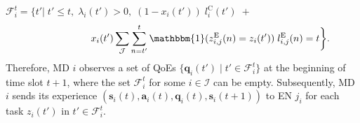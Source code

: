 \documentclass[12pt,draftclsnofoot,onecolumn]{IEEEtran}
\begin{document}
$\mathcal{F}_i^t =\bigg \{ t' \bigg|\; t' \leq t,\; \lambda_i(t')>0, \; (1 - x_i(t')) \; l_i^{\text{C}}(t') \; + $ \vspace{-3mm}
\begin{equation}
	\hspace{20mm} x_i(t')\sum\limits_{\mathcal{J}} \sum\limits_{n= t'}^{t}\mathbbm{1}(z_{i,j}^{\text{E}}(n)=z_i(t'))  \; l_{i,j}^{\text{E}}(n) = t \bigg\}.
	\label{27}  
	\nonumber
\end{equation}
Therefore, MD $i$ observes a set of QoEs $\{\boldsymbol{q}_i(t') \mid t' \in \mathcal{F}_i^t\}$ at the beginning of time slot $t+1$, where the set $\mathcal{F}_i^t$ for some $i \in \mathcal{I}$ can be empty. Subsequently, MD $i$ sends its experience $(\boldsymbol{s}_i(t), \boldsymbol{a}_i(t), \boldsymbol{q}_i(t), \boldsymbol{s}_i(t+1))$ to EN $j_i$ for each task $z_i(t')$ in $t' \in \mathcal{F}_i^t$.
\end{document}
